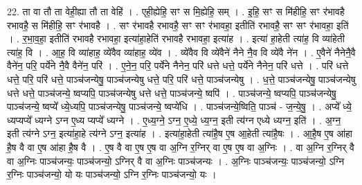 \documentclass[17pt]{extarticle}
\begin{document}
22. ता वा तौ ता वेही॒ह्या तौ ता वेहि॑ । . एही॒ह्येहि॒ सꣳ स मि॒ह्येहि॒ सम् । . इ॒हि॒ सꣳ स मि॑हीहि॒ सꣳ र॑भावहै रभावहै॒ स मि॑हीहि॒ सꣳ र॑भावहै । . सꣳ र॑भावहै रभावहै॒ सꣳ सꣳ र॑भावहा॒ इतीति॑ रभावहै॒ सꣳ सꣳ र॑भावहा॒ इति॑ । . र॒भा॒व॒हा॒ इतीति॑ रभावहै रभावहा॒ इत्या॑हा॒हेति॑ रभावहै रभावहा॒ इत्या॑ह । . इत्या॑ हा॒हेती त्या॑ह॒ वि व्या॑हेती त्या॑ह॒ वि । . आ॒ह॒ वि व्या॑हाह॒ व्ये॑वैव व्या॑हाह॒ व्ये॑व । . व्ये॑वैव वि व्ये॑वैने॑ नैने नै॒व वि व्ये॑वै ने॑न । . ए॒वैने॑ नैनेनै॒वै वैने॑न॒ परि॒ पर्ये॑ने नै॒वै वैने॑न॒ परि॑ । . ए॒ने॒न॒ परि॒ पर्ये॑ने नैनेन॒ परि॑ धत्ते धत्ते॒ पर्ये॑ने नैनेन॒ परि॑ धत्ते । . परि॑ धत्ते धत्ते॒ परि॒ परि॑ धत्ते॒ पाञ्च॑जन्येषु॒ पाञ्च॑जन्येषु धत्ते॒ परि॒ परि॑ धत्ते॒ पाञ्च॑जन्येषु । . ध॒त्ते॒ पाञ्च॑जन्येषु॒ पाञ्च॑जन्येषु धत्ते धत्ते॒ पाञ्च॑जन्ये॒ ष्वप्यपि॒ पाञ्च॑जन्येषु धत्ते धत्ते॒ पाञ्च॑जन्ये॒ ष्वपि॑ । . पाञ्च॑जन्ये॒ ष्वप्यपि॒ पाञ्च॑जन्येषु॒ पाञ्च॑जन्ये॒ ष्वप्ये᳚ ध्ये॒ध्यपि॒ पाञ्च॑जन्येषु॒ पाञ्च॑जन्ये॒ ष्वप्ये॑धि । . पाञ्च॑जन्ये॒ष्विति॒ पाञ्च॑ - ज॒न्ये॒षु॒ । . अप्ये᳚ ध्ये॒ ध्यप्यप्ये᳚ ध्यग्ने ऽग्न ए॒ध्य प्यप्ये᳚ ध्यग्ने । . ए॒ध्य॒ग्ने॒ ऽग्न॒ ए॒ध्ये॒ ध्य॒ग्न॒ इती त्य॑ग्न एध्ये ध्यग्न॒ इति॑ । . अ॒ग्न॒ इती त्य॑ग्ने ऽग्न॒ इत्या॑हा॒हे त्य॑ग्ने ऽग्न॒ इत्या॑ह । . इत्या॑हा॒हेती त्या॑है॒ष ए॒ष आ॒हेती त्या॑है॒षः । . आ॒है॒ष ए॒ष आ॑हा है॒ष वै वा ए॒ष आ॑हा है॒ष वै । . ए॒ष वै वा ए॒ष ए॒ष वा अ॒ग्नि र॒ग्निर् वा ए॒ष ए॒ष वा अ॒ग्निः । . वा अ॒ग्नि र॒ग्निर् वै वा अ॒ग्निः पाञ्च॑जन्यः॒ पाञ्च॑जन्यो॒ ऽग्निर् वै वा अ॒ग्निः पाञ्च॑जन्यः । . अ॒ग्निः पाञ्च॑जन्यः॒ पाञ्च॑जन्यो॒ ऽग्नि र॒ग्निः पाञ्च॑जन्यो॒ यो यः पाञ्च॑जन्यो॒ ऽग्नि र॒ग्निः पाञ्च॑जन्यो॒ यः । \newline
\end{document}
